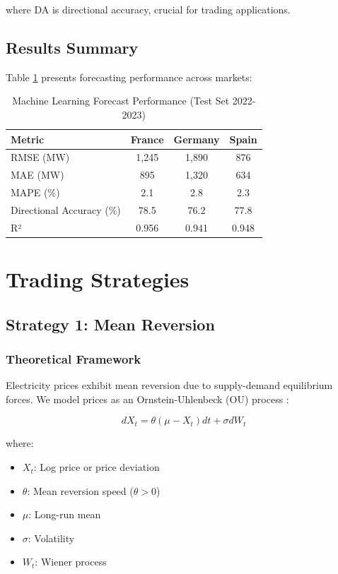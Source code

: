 \documentclass[12pt,a4paper]{article}
\begin{document}
where DA is directional accuracy, crucial for trading applications.

\subsection{Results Summary}

Table \ref{tab:forecast_results} presents forecasting performance across markets:

\begin{table}[h]
\centering
\caption{Machine Learning Forecast Performance (Test Set 2022-2023)}
\label{tab:forecast_results}
\begin{tabular}{lccc}
\toprule
\textbf{Metric} & \textbf{France} & \textbf{Germany} & \textbf{Spain} \\
\midrule
RMSE (MW) & 1,245 & 1,890 & 876 \\
MAE (MW) & 895 & 1,320 & 634 \\
MAPE (\%) & 2.1 & 2.8 & 2.3 \\
Directional Accuracy (\%) & 78.5 & 76.2 & 77.8 \\
R² & 0.956 & 0.941 & 0.948 \\
\bottomrule
\end{tabular}
\end{table}

\section{Trading Strategies}

\subsection{Strategy 1: Mean Reversion}

\subsubsection{Theoretical Framework}

Electricity prices exhibit mean reversion due to supply-demand equilibrium forces. We model prices as an Ornstein-Uhlenbeck (OU) process \citep{uhlenbeck1930theory}:

\begin{equation}
dX_t = \theta(\mu - X_t)dt + \sigma dW_t
\end{equation}

where:
\begin{itemize}
    \item $X_t$: Log price or price deviation
    \item $\theta$: Mean reversion speed ($\theta > 0$)
    \item $\mu$: Long-run mean
    \item $\sigma$: Volatility
    \item $W_t$: Wiener process
\end{itemize}
\end{document}
